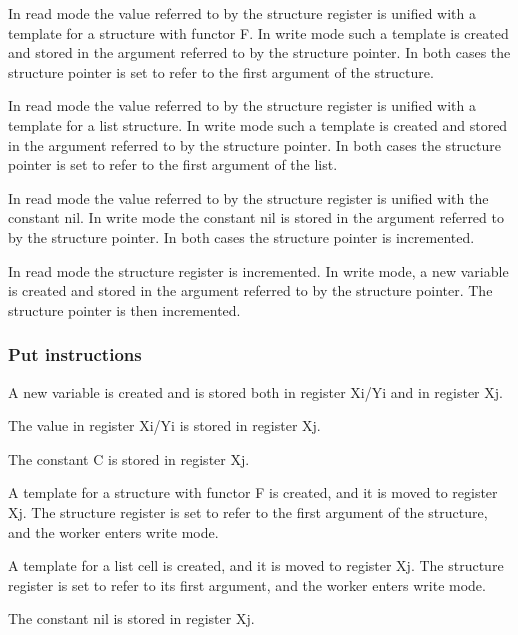 In read mode the value referred to by the structure register is
unified with a template for a structure with functor F. In write mode
such a template is created  and stored in the
argument referred to by the structure pointer. In both cases the
structure pointer is set to refer to the first argument of the
structure.

In read mode the value referred to by the structure register is
unified with a template for a list structure. In write mode such a template
is created and stored in the argument referred to by
the structure pointer. In both cases the structure pointer is set to
refer to the first argument of the list.

In read mode the value referred to by the structure register is
unified with the constant nil. In write mode the constant nil is stored in
the argument referred to by the structure pointer. In both cases the
structure pointer is incremented.

In read mode the structure register is incremented. In write mode, a new
variable is created and stored in the argument referred to by the structure
pointer. The structure pointer is then incremented.

\subsubsection{Put instructions}

A new variable is created and is stored both in register Xi/Yi and in
register Xj. 

The value in register Xi/Yi is stored in register Xj. 

The constant C is stored in register Xj. 

A template for a structure with functor F is created, and it is moved
to register Xj.  The structure register is set to refer to the first
argument of the structure, and the worker enters write mode.

A template for a list cell is created, and it is moved to register Xj.
The structure register is set to refer to its first argument, and the
worker enters write mode.

The constant nil is stored in  register Xj.

